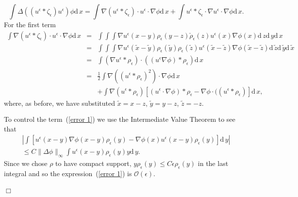 \documentclass[12pt]{article}
\newenvironment {proof}{{\noindent\bf Proof }}{\hfill $\Box$ \medskip}
\def \tilde{\widetilde}
\newcommand{\dif}{\mathrm{d}\,}
\begin{document}
\begin{proof}
\begin{equation}
\label{total equation}
\int\Delta\left((u^\epsilon*\zeta_\epsilon)u^\epsilon\right)\phi \dif x =
\int \nabla(u^\epsilon*\zeta_\epsilon)\cdot
u^\epsilon\cdot\nabla\phi \dif x +\int u^\epsilon*\zeta_\epsilon
\cdot\nabla u^\epsilon
\cdot \nabla\phi \dif x.
\end{equation}
For the first term
\begin{eqnarray}
\nonumber
\int \nabla(u^\epsilon*\zeta_\epsilon)\cdot u^\epsilon\cdot\nabla\phi \dif x
&=&
\int\int\int\nabla u^\epsilon(x-y)\rho_\epsilon(y-z)\check{\rho}_\epsilon(z)
u^\epsilon(x)\nabla\phi(x)\dif z \dif y \dif x
\\
\nonumber
&=&
\int\int\int\nabla u^\epsilon(\tilde{x}-\tilde{y})\rho_\epsilon(\tilde{y})
\rho_\epsilon(\tilde{z})u^\epsilon(\tilde{x}-\tilde{z})
\nabla\phi(\tilde{x}-\tilde{z})\dif \tilde{z}\dif \tilde{y} \dif \tilde{x}
\\
\nonumber
&=&\int(\nabla u^\epsilon*\rho_\epsilon)\cdot
\left((u^\epsilon\nabla\phi)*\rho_\epsilon\right)
\dif x\\
\nonumber
&=&
\frac{1}{2}\int\nabla ((u^\epsilon*\rho_\epsilon)^2)\cdot\nabla\phi \dif x
\\
\label{error 1}
&&+
\int\nabla(u^\epsilon*\rho_\epsilon)
\left[(u^\epsilon\cdot\nabla\phi)*\rho_\epsilon-
\nabla\phi\cdot((u^\epsilon*\rho_\epsilon)\right]\dif x,
\end{eqnarray}
where, as before, we have substituted $\tilde{x}=x-z$, $\tilde{y}=y-z$,
$\tilde{z}=-z$.

To control the term~(\ref{error 1})
we use the Intermediate Value Theorem to see that
\begin{multline*}
\left|\int\left[u^\epsilon(x-y)\nabla\phi(x-y)\rho_\epsilon(y)-
\nabla\phi(x)u^\epsilon(x-y)\rho_\epsilon(y)
\right]\dif y\right|
\\
\leq C\|\Delta\phi\|_\infty\int u^\epsilon (x-y)\rho_\epsilon(y)y\dif y.
\end{multline*}
Since we chose $\rho$ to have compact support,
$y\rho_\epsilon(y)\leq C\epsilon\rho_\epsilon(y)$
in the last integral and so the expression~(\ref{error 1}) is
$\mathcal{O}(\epsilon)$.


\end{proof}
\end{document}
